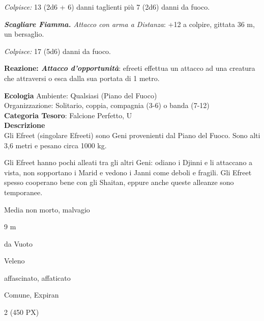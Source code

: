 \begin{multicols}{2}
{\emph{Colpisce:} 13 (2d6 + 6) danni taglienti più 7 (2d6) danni da fuoco.

\emph{\textbf{Scagliare Fiamma.} Attacco con arma a Distanza}: +12 a colpire, gittata 36 m, un bersaglio.

\emph{Colpisce:} 17 (5d6) danni da fuoco.

\textbf{Reazione: \emph{Attacco d'opportunità}}: efreeti effettua un attacco ad una creatura che attraversi o esca dalla sua portata di 1 metro.

\textbf{Ecologia}
Ambiente: Qualsiasi (Piano del Fuoco)\\
Organizzazione: Solitario, coppia, compagnia (3-6) o banda (7-12)\\
\textbf{Categoria Tesoro}: Falcione Perfetto, U\\
\textbf{Descrizione}\\
Gli Efreet (singolare Efreeti) sono Geni provenienti dal Piano del Fuoco. Sono alti 3,6 metri e pesano circa 1000 kg.

Gli Efreet hanno pochi alleati tra gli altri Geni: odiano i Djinni e li attaccano a vista, non sopportano i Marid e vedono i Janni come deboli e fragili. Gli Efreet spesso cooperano bene con gli Shaitan, eppure anche queste alleanze sono temporanee.

\begin{description}[noitemsep, topsep=0pt, parsep=0pt, partopsep=0pt, itemsep=1pt, leftmargin=2.35cm,  labelwidth=2.2cm, itemindent=0cm, listparindent=0pt] %
\setlength{\baselineskip}{10pt}
\item[\textbf{Taglia/Tipo}] Media non morto, malvagio
\item[\textbf{Caratt.}] 
\item[\textbf{Punti Ferita}] 
\item[\textbf{Movimento}] 9 m
\item[\textbf{Tiri Salvez.}] 
\item[\textbf{Res. Danni}] da Vuoto
\item[\textbf{Imm. Danni}] Veleno
\item[\textbf{Immunità}] affascinato, affaticato
\item[\textbf{Sensi}] 
\item[\textbf{Linguaggi}] Comune, Expiran
\item[\textbf{Sfida}] 2 (450 PX)
\end{description}
\smallskip

}
\end{multicols}
